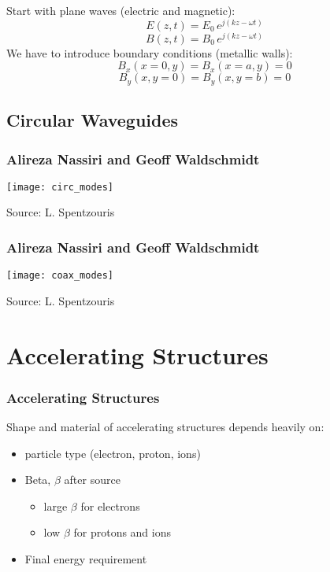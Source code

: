 \documentclass[professionalfonts,t]{beamer}
\begin{document}
\begin{frame}
	Start with plane waves (electric and magnetic):
	\begin{equation}
		E\left(z,t\right) =E_0\,e^{j\left(kz-\omega t\right)}
	\end{equation}
	\begin{equation}
		B\left(z,t\right) =B_0\,e^{j\left(kz-\omega t\right)}
	\end{equation}
	We have to introduce boundary conditions (metallic walls):
		\begin{equation}
			B_x\left(x=0,y\right) = B_x\left(x=a,y\right)= 0
		\end{equation}
		\begin{equation}
			B_y\left(x,y=0\right) = B_y\left(x,y=b\right)=0
		\end{equation}
	
\end{frame}

\subsection{Circular Waveguides}
\begin{frame}
\frametitle{Alireza Nassiri and Geoff Waldschmidt}
\centering
	\texttt{[image: circ\_modes]}
	
	Source: L. Spentzouris
\end{frame}
\begin{frame}
\frametitle{Alireza Nassiri and Geoff Waldschmidt}
\centering
	\texttt{[image: coax\_modes]}
	\vspace{-1em}
	
	Source: L. Spentzouris
\end{frame}


\section{Accelerating Structures}
\begin{frame}
\frametitle{Accelerating Structures}
Shape and material of accelerating structures depends heavily on: 
\begin{itemize}
	\item particle type (electron, proton, ions)
	\item Beta, $\beta$ after source
	\begin{itemize}
		\item large $\beta$ for electrons
		\item low $\beta$ for protons and ions
	\end{itemize}
	\item Final energy requirement
\end{itemize}
\end{frame}
\end{document}

